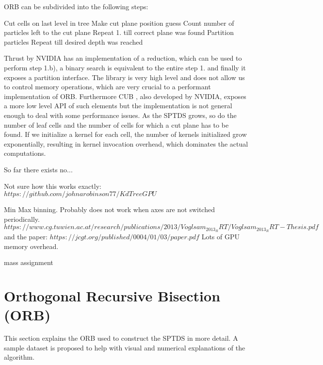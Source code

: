 \documentclass[]{article}
\begin{document}
ORB can be subdivided into the following steps:

\begin{outline}[enumerate]
	\1 Cut cells on last level in tree
	\2 Make cut plane position guess
	\2 Count number of particles left to the cut plane
	\2 Repeat 1. till correct plane was found
	\1 Partition particles
	\1 Repeat till desired depth was reached
\end{outline}

Thrust by NVIDIA \cite{thrust} has an implementation of a reduction, which can be used to perform step 1.b), a binary search is equivalent to the entire step 1. and finally it exposes a partition interface. The library is very high level and does not allow us to control memory operations, which are very crucial to a performant implementation of ORB. 
Furthermore CUB \cite{cub}, also developed by NVIDIA, exposes a more low level API of such elements but the implementation is not general enough to deal with some performance issues. As the SPTDS grows, so do the number of leaf cells and the number of cells for which a cut plane has to be found. If we initialize a kernel for each cell, the number of kernels initialized grow exponentially, resulting in kernel invocation overhead, which dominates the actual computations.


So far there exists no...

Not sure how this works exactly:
$https://github.com/johnarobinson77/KdTreeGPU$

Min Max binning. Probably does not work when axes are not switched periodically.
$https://www.cg.tuwien.ac.at/research/publications/2013/Voglsam_2013_RRT/Voglsam_2013_RRT-Thesis.pdf$
and the paper:
$https://jcgt.org/published/0004/01/03/paper.pdf$ Lots of GPU memory overhead.

mass assignment



\newpage
\section{Orthogonal Recursive Bisection (ORB)} \label{section:orb}


This section explains the ORB used to construct the SPTDS in more detail. A sample dataset is proposed to help with visual and numerical explanations of the algorithm. 
\end{document}
